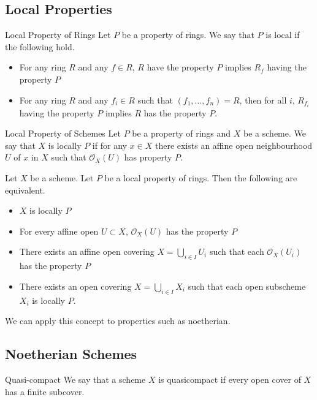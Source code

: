 \documentclass[a4paper]{article}
\begin{document}
\subsection{Local Properties}
\begin{defn}{Local Property of Rings}{} Let $P$ be a property of rings. We say that $P$ is local if the following hold. 
\begin{itemize}
\item For any ring $R$ and any $f\in R$, $R$ have the property $P$ implies $R_f$ having the property $P$
\item For any ring $R$ and any $f_i\in R$ such that $(f_1,\dots,f_n)=R$, then for all $i$, $R_{f_i}$ having the property $P$ implies $R$ has the property $P$. 
\end{itemize}
\end{defn}

\begin{defn}{Local Property of Schemes}{} Let $P$ be a property of rings and $X$ be a scheme. We say that $X$ is locally $P$ if for any $x\in X$ there exists an affine open neighbourhood $U$ of $x$ in $X$ such that $\mathcal{O}_X(U)$ has property $P$. 
\end{defn}

\begin{lmm}{}{} Let $X$ be a scheme. Let $P$ be a local property of rings. Then the following are equivalent. 
\begin{itemize}
\item $X$ is locally $P$
\item For every affine open $U\subset X$, $\mathcal{O}_X(U)$ has the property $P$
\item There exists an affine open covering $X=\bigcup_{i\in I}U_i$ such that each $\mathcal{O}_X(U_i)$ has the property $P$
\item There exists an open covering $X=\bigcup_{i\in I}X_i$ such that each open subscheme $X_i$ is locally $P$. 
\end{itemize}
\end{lmm}

We can apply this concept to properties such as noetherian. 

\subsection{Noetherian Schemes}
\begin{defn}{Quasi-compact}{} We say that a scheme $X$ is quasicompact if every open cover of $X$ has a finite subcover. 
\end{defn}
\end{document}
